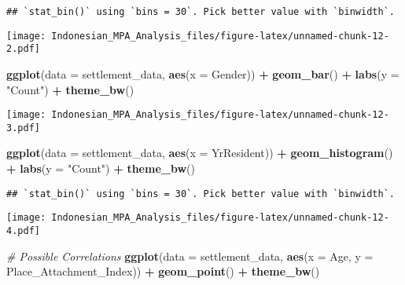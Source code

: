 \documentclass[
]{article}
\newenvironment{Shaded}{\begin{snugshade}}{\end{snugshade}}
\newcommand{\AttributeTok}[1]{\textcolor[rgb]{0.13,0.29,0.53}{#1}}
\newcommand{\CommentTok}[1]{\textcolor[rgb]{0.56,0.35,0.01}{\textit{#1}}}
\newcommand{\FunctionTok}[1]{\textcolor[rgb]{0.13,0.29,0.53}{\textbf{#1}}}
\newcommand{\NormalTok}[1]{#1}
\newcommand{\SpecialCharTok}[1]{\textcolor[rgb]{0.81,0.36,0.00}{\textbf{#1}}}
\newcommand{\StringTok}[1]{\textcolor[rgb]{0.31,0.60,0.02}{#1}}
\begin{document}
\begin{verbatim}
## `stat_bin()` using `bins = 30`. Pick better value with `binwidth`.
\end{verbatim}

\texttt{[image: Indonesian\_MPA\_Analysis\_files/figure-latex/unnamed-chunk-12-2.pdf]}

\begin{Shaded}
\begin{Highlighting}[]
\FunctionTok{ggplot}\NormalTok{(}\AttributeTok{data =}\NormalTok{ settlement\_data, }\FunctionTok{aes}\NormalTok{(}\AttributeTok{x =}\NormalTok{ Gender)) }\SpecialCharTok{+}
  \FunctionTok{geom\_bar}\NormalTok{() }\SpecialCharTok{+}
  \FunctionTok{labs}\NormalTok{(}\AttributeTok{y =} \StringTok{"Count"}\NormalTok{) }\SpecialCharTok{+}
  \FunctionTok{theme\_bw}\NormalTok{()}
\end{Highlighting}
\end{Shaded}

\texttt{[image: Indonesian\_MPA\_Analysis\_files/figure-latex/unnamed-chunk-12-3.pdf]}

\begin{Shaded}
\begin{Highlighting}[]
\FunctionTok{ggplot}\NormalTok{(}\AttributeTok{data =}\NormalTok{ settlement\_data, }\FunctionTok{aes}\NormalTok{(}\AttributeTok{x =}\NormalTok{ YrResident)) }\SpecialCharTok{+}
  \FunctionTok{geom\_histogram}\NormalTok{() }\SpecialCharTok{+}
  \FunctionTok{labs}\NormalTok{(}\AttributeTok{y =} \StringTok{"Count"}\NormalTok{) }\SpecialCharTok{+}
  \FunctionTok{theme\_bw}\NormalTok{()}
\end{Highlighting}
\end{Shaded}

\begin{verbatim}
## `stat_bin()` using `bins = 30`. Pick better value with `binwidth`.
\end{verbatim}

\texttt{[image: Indonesian\_MPA\_Analysis\_files/figure-latex/unnamed-chunk-12-4.pdf]}

\begin{Shaded}
\begin{Highlighting}[]
\CommentTok{\# Possible Correlations}
\FunctionTok{ggplot}\NormalTok{(}\AttributeTok{data =}\NormalTok{ settlement\_data, }\FunctionTok{aes}\NormalTok{(}\AttributeTok{x =}\NormalTok{ Age, }\AttributeTok{y =}\NormalTok{ Place\_Attachment\_Index)) }\SpecialCharTok{+}
  \FunctionTok{geom\_point}\NormalTok{() }\SpecialCharTok{+}
  \FunctionTok{theme\_bw}\NormalTok{()}
\end{Highlighting}
\end{Shaded}
\end{document}
